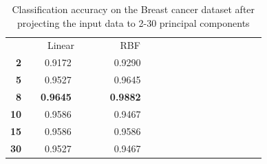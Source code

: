 \documentclass{article}
\newcommand{\ra}[1]{\renewcommand{\arraystretch}{#1}}
\begin{document}
\begin{table}\centering
\ra{1.3}
\begin{tabular}{@{}rrrrrrrrrrccrrrcrrr@{}}\toprule
& \multicolumn{4}{c}{Linear} & \phantom{abc}& \multicolumn{2}{c}{RBF} &
\phantom{abc} \\

 \textbf{2}&   &     0.9172&   &&  &0.9290 &  \\
  \textbf{5}&   &  0.9527 &   &&  &     0.9645 &  \\
   \textbf{8}&   &  \textbf{0.9645} &   &&  &   \textbf{ 0.9882} &  \\
    \textbf{10}&   & 0.9586 &   &&  &  0.9467&  \\
    \textbf{15}&   &  0.9586 &   &&  &   0.9586 &  \\
    \textbf{30}&   &  0.9527 &   &&  &  0.9467 &  \\


\bottomrule
\end{tabular}
\caption{Classification accuracy on the Breast cancer dataset after projecting the input data to 2-30 principal components}
       \label{fig:brtable}
\end{table} 
 
\end{document}

